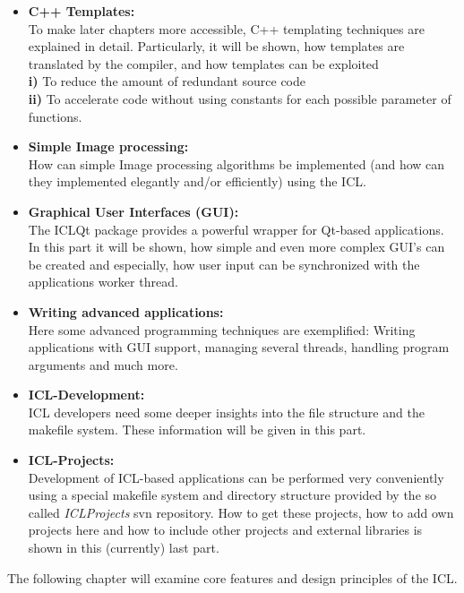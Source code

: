 \begin{itemize}
\item \textbf{C++ Templates:}\\ To make later chapters more accessible, C++ templating techniques are explained in detail. Particularly, it will be shown, how templates are translated by the compiler, and how templates can be exploited\\
\small{\textbf{i)}} To reduce the amount of redundant source code\\
\small{\textbf{ii)}} To accelerate code without using constants for each possible parameter of functions.    

\item \textbf{Simple Image processing:}\\ How can simple Image processing algorithms be implemented (and how can they implemented elegantly and/or efficiently) using the ICL.
\item \textbf{Graphical User Interfaces (GUI):}\\ The ICLQt package provides a powerful wrapper for Qt-based applications. In this part it will be shown, how simple and even more complex GUI's can be created and especially, how user input can be synchronized with the applications worker thread.
\item \textbf{Writing advanced applications:}\\ Here some advanced programming techniques are exemplified: Writing applications with GUI support, managing several threads, handling program arguments and much more.
\item \textbf{ICL-Development:}\\ICL developers need some deeper insights into the file structure and the makefile system. These information will be given in this part.
\item \textbf{ICL-Projects:}\\Development of ICL-based applications can be performed very conveniently using a special makefile system and directory structure provided by the so called \emph{ICLProjects} svn repository. How to get these projects, how to add own projects here and how to include other projects and external libraries is shown in this (currently) last part. 
\end{itemize} 


The following chapter will examine core features and design principles of the ICL.



